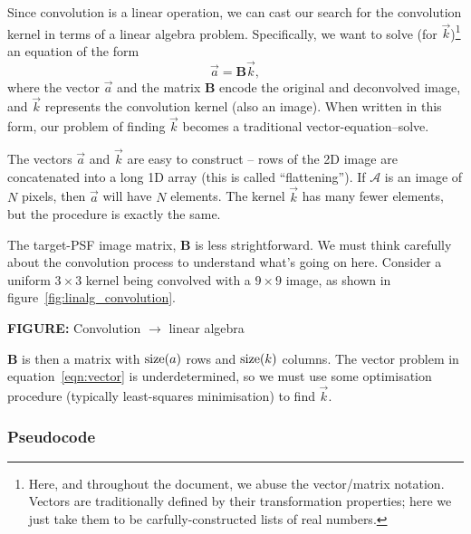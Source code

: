 \documentclass[letterpaper, 11pt]{article}
\def\ra{\ensuremath{\rightarrow}\xspace}
\def\MORE{{\color{red}{\bf MORE}}\xspace}
\def\FIG#1{{\bf FIGURE: }{#1}}
\begin{document}
Since convolution is a linear operation, we can cast our search for the convolution kernel in terms of a linear algebra problem. Specifically, we want to solve (for $\vec k$)\footnote{Here, and throughout the document, we abuse the vector/matrix notation. Vectors are traditionally defined by their transformation properties; here we just take them to be carfully-constructed lists of real numbers.} an equation of the form
\begin{equation}\label{eqn:vector}
	\vec a = \mathbf{B} \vec k,
\end{equation}
where the vector $\vec a$ and the matrix $\mathbf{B}$ encode the original and deconvolved image, and $\vec k$ represents the convolution kernel (also an image). When written in this form, our problem of finding $\vec k$ becomes a traditional vector-equation--solve.

The vectors $\vec a$ and $\vec k$ are easy to construct -- rows of the 2D image are concatenated into a long 1D array (this is called ``flattening''). If $\mathcal A$ is an image of $N$ pixels, then $\vec a$ will have $N$ elements. The kernel $\vec k$ has many fewer elements, but the procedure is exactly the same.

The target-PSF image matrix, $\mathbf B$ is less strightforward. We must think carefully about the convolution process to understand what's going on here. Consider a uniform $3\!\times\!3$ kernel being convolved with a $9\!\times\!9$ image, as shown in figure~\ref{fig:linalg_convolution}.

\FIG{Convolution \ra linear algebra}\label{fig:linalg_convolution}

\MORE

$\mathbf B$ is then a matrix with ${\rm size}(a)$ rows and ${\rm size}(k)$ columns. The vector problem in equation~\ref{eqn:vector} is underdetermined, so we must use some optimisation procedure (typically least-squares minimisation) to find $\vec k$.

\subsubsection{Pseudocode}
\end{document}
